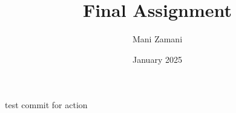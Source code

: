 \documentclass{article}
\title{Final Assignment}
\author{Mani Zamani}
\date{January 2025}
\begin{document}
\maketitle

test commit for action
\end{document}
